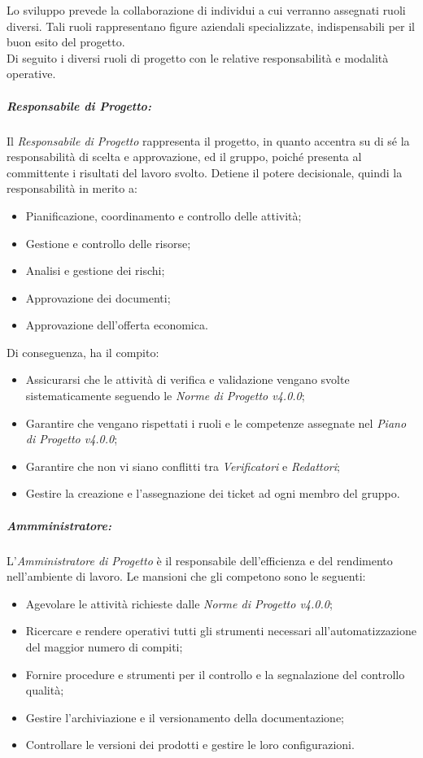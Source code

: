 Lo sviluppo prevede la collaborazione di individui a cui verranno assegnati ruoli diversi. Tali ruoli rappresentano figure aziendali specializzate, indispensabili per il buon esito del progetto.\\
Di seguito i diversi ruoli di progetto con le relative responsabilità e modalità operative.
\subparagraph{Responsabile di Progetto:}
Il \textit{Responsabile di Progetto} rappresenta il progetto, in quanto accentra su di sé la responsabilità di scelta e approvazione, ed il gruppo, poiché presenta al committente i risultati del lavoro svolto.
Detiene il potere decisionale, quindi la responsabilità in merito a:
\begin{itemize}
	\item Pianificazione, coordinamento e controllo delle attività;
	\item Gestione e controllo delle risorse;
	\item Analisi e gestione dei rischi;
	\item Approvazione dei documenti;
	\item Approvazione dell'offerta economica.
\end{itemize}
Di conseguenza, ha il compito:
\begin{itemize}
	\item Assicurarsi che le attività di verifica e validazione vengano svolte sistematicamente seguendo le \textit{Norme di Progetto v4.0.0};
	\item Garantire che vengano rispettati i ruoli e le competenze assegnate nel \textit{Piano di Progetto v4.0.0};
	\item Garantire che non vi siano conflitti tra \textit{Verificatori} e \textit{Redattori};
	\item Gestire la creazione e l'assegnazione dei \gls{ticket} ad ogni membro del gruppo.
\end{itemize}
\subparagraph{Ammministratore:}
L'\textit{Amministratore di Progetto} è il responsabile dell'efficienza e del rendimento nell'ambiente di lavoro. Le mansioni che gli competono sono le seguenti:
\begin{itemize}
	\item Agevolare le attività richieste dalle \textit{Norme di Progetto v4.0.0};
	\item Ricercare e rendere operativi tutti gli strumenti necessari all'automatizzazione del maggior numero di compiti;
	\item Fornire procedure e strumenti per il controllo e la segnalazione del controllo qualità;
	\item Gestire l'archiviazione e il \gls{versionamento} della documentazione;
	\item Controllare le versioni dei prodotti e gestire le loro configurazioni.
\end{itemize}
